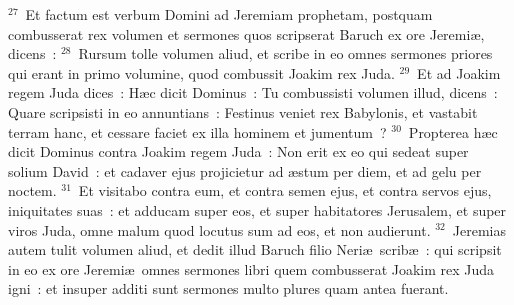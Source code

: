 ${}^{27}$~Et factum est verbum Domini ad Jeremiam prophetam, postquam combusserat rex volumen et sermones quos scripserat Baruch ex ore Jeremi\ae , dicens~:
${}^{28}$~Rursum tolle volumen aliud, et scribe in eo omnes sermones priores qui erant in primo volumine, quod combussit Joakim rex Juda.
${}^{29}$~Et ad Joakim regem Juda dices~: H\ae c dicit Dominus~: Tu combussisti volumen illud, dicens~: Quare scripsisti in eo annuntians~: Festinus veniet rex Babylonis, et vastabit terram hanc, et cessare faciet ex illa hominem et jumentum~?
${}^{30}$~Propterea h\ae c dicit Dominus contra Joakim regem Juda~: Non erit ex eo qui sedeat super solium David~: et cadaver ejus projicietur ad \ae stum per diem, et ad gelu per noctem.
${}^{31}$~Et visitabo contra eum, et contra semen ejus, et contra servos ejus, iniquitates suas~: et adducam super eos, et super habitatores Jerusalem, et super viros Juda, omne malum quod locutus sum ad eos, et non audierunt.
${}^{32}$~Jeremias autem tulit volumen aliud, et dedit illud Baruch filio Neri\ae\ scrib\ae~: qui scripsit in eo ex ore Jeremi\ae\ omnes sermones libri quem combusserat Joakim rex Juda igni~: et insuper additi sunt sermones multo plures quam antea fuerant.

